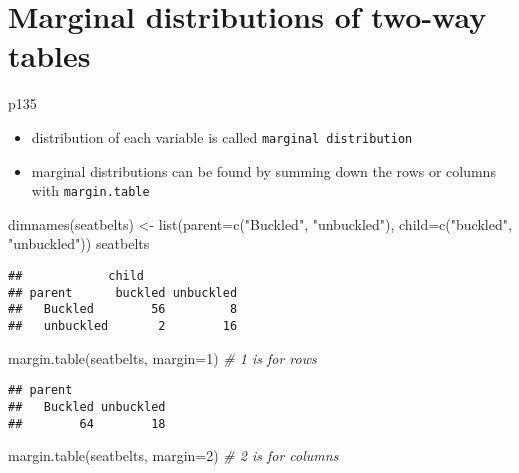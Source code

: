 \documentclass[
]{book}
\newenvironment{Shaded}{\begin{snugshade}}{\end{snugshade}}
\newcommand{\AttributeTok}[1]{\textcolor[rgb]{0.77,0.63,0.00}{#1}}
\newcommand{\CommentTok}[1]{\textcolor[rgb]{0.56,0.35,0.01}{\textit{#1}}}
\newcommand{\DecValTok}[1]{\textcolor[rgb]{0.00,0.00,0.81}{#1}}
\newcommand{\FunctionTok}[1]{\textcolor[rgb]{0.00,0.00,0.00}{#1}}
\newcommand{\NormalTok}[1]{#1}
\newcommand{\OtherTok}[1]{\textcolor[rgb]{0.56,0.35,0.01}{#1}}
\newcommand{\StringTok}[1]{\textcolor[rgb]{0.31,0.60,0.02}{#1}}
\providecommand{\tightlist}{%
  \setlength{\itemsep}{0pt}\setlength{\parskip}{0pt}}
\theoremstyle{definition}
\theoremstyle{definition}
\theoremstyle{definition}
\theoremstyle{definition}
\theoremstyle{remark}
\begin{document}
\hypertarget{marginal-distributions-of-two-way-tables}{%
\section{Marginal distributions of two-way tables}\label{marginal-distributions-of-two-way-tables}}

p135

\begin{itemize}
\tightlist
\item
  distribution of each variable is called \texttt{marginal\ distribution}
\item
  marginal distributions can be found by summing down the rows or columns with \texttt{margin.table}
\end{itemize}

\begin{Shaded}
\begin{Highlighting}[]
\FunctionTok{dimnames}\NormalTok{(seatbelts) }\OtherTok{\textless{}{-}} \FunctionTok{list}\NormalTok{(}\AttributeTok{parent=}\FunctionTok{c}\NormalTok{(}\StringTok{"Buckled"}\NormalTok{, }\StringTok{"unbuckled"}\NormalTok{),}
                            \AttributeTok{child=}\FunctionTok{c}\NormalTok{(}\StringTok{"buckled"}\NormalTok{, }\StringTok{"unbuckled"}\NormalTok{))}
\NormalTok{seatbelts}
\end{Highlighting}
\end{Shaded}

\begin{verbatim}
##            child
## parent      buckled unbuckled
##   Buckled        56         8
##   unbuckled       2        16
\end{verbatim}

\begin{Shaded}
\begin{Highlighting}[]
\FunctionTok{margin.table}\NormalTok{(seatbelts, }\AttributeTok{margin=}\DecValTok{1}\NormalTok{)  }\CommentTok{\# 1 is for rows}
\end{Highlighting}
\end{Shaded}

\begin{verbatim}
## parent
##   Buckled unbuckled 
##        64        18
\end{verbatim}

\begin{Shaded}
\begin{Highlighting}[]
\FunctionTok{margin.table}\NormalTok{(seatbelts, }\AttributeTok{margin=}\DecValTok{2}\NormalTok{)  }\CommentTok{\# 2 is for columns}
\end{Highlighting}
\end{Shaded}
\end{document}

